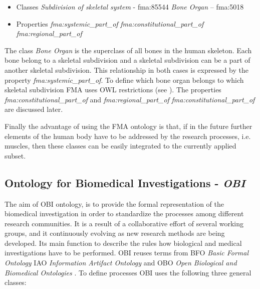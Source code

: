 \begin{itemize}
	\item{Classes}
		\subitem \textit{Subdivision of skeletal system} - fma:85544 
		\subitem \textit{Bone Organ} – fma:5018
\end{itemize}

\begin{itemize}
	\item{Properties}
		\subitem \textit{fma:systemic\_part\_of}
		\subitem \textit{fma:constitutional\_part\_of}
		\subitem \textit{fma:regional\_part\_of}
\end{itemize}

The class \textit{Bone Organ} is the superclass of all bones in the human skeleton. Each bone belong to a skeletal subdivision and a skeletal subdivision can be a part of another skeletal subdivision. This relationship in both cases is expressed by the property \textit{fma:systemic\_part\_of}. To define which bone organ belongs to which skeletal subdivision FMA uses OWL restrictions (see ). The properties \textit{fma:constitutional\_part\_of} and \textit{fma:regional\_part\_of} \textit{fma:constitutional\_part\_of} are discussed later.


Finally the advantage of using the FMA ontology is that, if in the future further elements of the human body have to be addressed by the research processes, i.e. muscles, then these classes can be easily integrated to the currently applied subset.

\subsection{Ontology for Biomedical Investigations - \textit{OBI}} \label{obi}


The aim of OBI ontology, is to provide the formal representation of the biomedical investigation in order to standardize the processes among different research communities. It is a result of a collaborative effort of several working groups, and it continuously evolving as new research methods are being developed. Its main function to describe the rules how biological and medical investigations have to be performed. OBI reuses terms from BFO \textit{Basic Formal Ontology} IAO \textit{Information Artifact Ontology} and  OBO \textit{Open Biological and Biomedical Ontologies} \cite{10.1371/journal.pone.0154556}. To define processes OBI uses the following three general classes:

